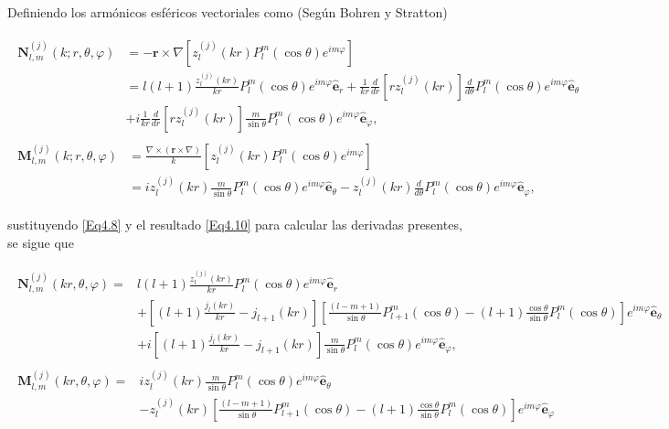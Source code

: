 \documentclass[a4paper,10pt]{article}
\newcommand{\hatbf}[1] {\hat{\mathbf{#1}}}	%
\begin{document}
Definiendo los armónicos esféricos vectoriales como (Según Bohren y Stratton)

\begin{subequations}
\begin{align}
\begin{split}
\textbf{N}_{l,m}^{(j)}(k;r,\theta,\varphi)&=-\textbf{r}\times\nabla[z_l^{(j)}(kr)P_l^m(\cos\theta)e^{im\varphi}]	\\
&=l(l+1)\frac{z_l^{(j)}(kr)}{kr}P_l^m(\cos\theta)e^{im\varphi}\hatbf{e}_r+\frac{1}{kr}\frac{d}{dr}[rz_l^{(j)}(kr)]\frac{d}{d\theta}P_l^m(\cos\theta)e^{im\varphi}\hatbf{e}_{\theta}	\\
&+i\frac{1}{kr}\frac{d}{dr}[rz_l^{(j)}(kr)]\frac{m}{\sin\theta}P_l^m(\cos\theta)e^{im\varphi}\hatbf{e}_{\varphi},	
\end{split}\\
\begin{split}
\textbf{M}_{l,m}^{(j)}(k;r,\theta,\varphi)&=\frac{\nabla\times(\textbf{r}\times\nabla)}{k}[z_l^{(j)}(kr)P_l^m(\cos\theta)e^{im\varphi}]\\
&=iz_l^{(j)}(kr)\frac{m}{\sin\theta}P_l^m(\cos\theta)e^{im\varphi}\hatbf{e}_{\theta}-z_l^{(j)}(kr)\frac{d}{d\theta}P_l^m(\cos\theta)e^{im\varphi}\hatbf{e}_{\varphi},
\end{split}
\end{align}
\end{subequations}

sustituyendo \eqref{Eq4.8} y el resultado \eqref{Eq4.10} para calcular las derivadas presentes, se sigue que

\begin{subequations}
\begin{align}
\begin{split}
\textbf{N}_{l,m}^{(j)}(kr,\theta,\varphi)
=&l(l+1)\frac{z_l^{(j)}(kr)}{kr}P_l^m(\cos\theta)e^{im\varphi}\hatbf{e}_r	\\
&+\left[(l+1)\frac{j_l(kr)}{kr}-j_{l+1}(kr)\right]\left[\frac{(l-m+1)}{\sin\theta}P_{l+1}^m(\cos\theta)-(l+1)\frac{\cos\theta}{\sin\theta}P_l^m(\cos\theta)\right]e^{im\varphi}\hatbf{e}_{\theta}	\\
&+i\left[(l+1)\frac{j_l(kr)}{kr}-j_{l+1}(kr)\right]\frac{m}{\sin\theta}P_l^m(\cos\theta)e^{im\varphi}\hatbf{e}_{\varphi},
\end{split}\\
\begin{split}
\textbf{M}_{l,m}^{(j)}(kr,\theta,\varphi)
=&iz_l^{(j)}(kr)\frac{m}{\sin\theta}P_l^m(\cos\theta)e^{im\varphi}\hatbf{e}_{\theta}	\\
&-z_l^{(j)}(kr)\left[\frac{(l-m+1)}{\sin\theta}P_{l+1}^m(\cos\theta)-(l+1)\frac{\cos\theta}{\sin\theta}P_l^m(\cos\theta)\right]e^{im\varphi}\hatbf{e}_{\varphi}
\end{split}
\end{align}
\label{Eq5.6}
\end{subequations}
\end{document}
